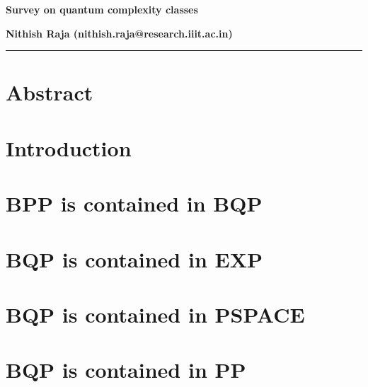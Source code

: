 



\noindent\textbf{\Large Survey on quantum complexity classes}
\vspace{2em}

\noindent
\textbf{Nithish Raja (nithish.raja@research.iiit.ac.in)}\\

\hrule

\section{Abstract}



\section{Introduction}



\section{BPP is contained in BQP}



\section{BQP is contained in EXP}



\section{BQP is contained in PSPACE}



\section{BQP is contained in PP}




